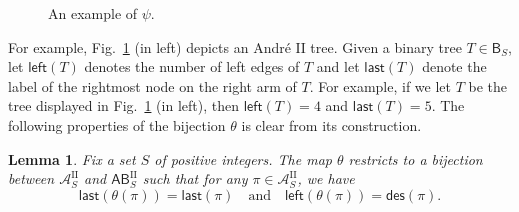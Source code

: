 \documentclass[12pt]{article}
\numberwithin{equation}{section}
\theoremstyle{plain}
\newtheorem{lemma}[theorem]{Lemma}
\def\des{\mathsf{des}}
\def\l{\mathsf{left}}
\def\B{\mathsf{B}}
\def\AB{\mathsf{AB}}
\def\last{\mathsf{last}}
\begin{document}
\begin{figure}

  \caption{An example of  $\psi$.}
  \label{fig:tree-psi}
\end{figure}

   		
   		For example,  Fig.~\ref{fig:tree-psi} (in left) depicts  an Andr\'e  $\mathrm{II}$ tree.
   		 Given a binary tree $T\in \B_S$, let $\l(T)$ denotes the number of left edges of $T$   and let $\last(T)$ denote the label of the rightmost  node on the right arm  of $T$.  For example, if we let $T$ be the tree displayed in Fig.~\ref{fig:tree-psi} (in left), then  $\l(T)=4$ and $\last(T)=5$. 
   		The following properties of the bijection $\theta$ is clear from its construction. 
   		
   		
   		\begin{lemma}\label{lem-theta-andre2}
   			Fix a set $S$ of positive integers.  The map $\theta$ restricts to a bijection between 
   			$\mathcal{A}^{\mathrm{II}}_S$ and $\AB^{\mathrm{II}}_S$ such that for any $\pi \in \mathcal{A}^{\mathrm{II}}_S$, we have
   			$$
   			\last(\theta(\pi))=\last(\pi)\quad\text{and}\quad \l(\theta(\pi))=\des(\pi). 
   			$$
   			\end{lemma}
   			
\end{document}
